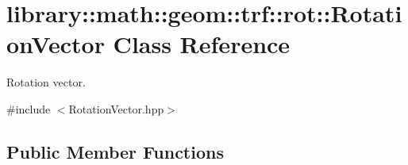 \hypertarget{classlibrary_1_1math_1_1geom_1_1trf_1_1rot_1_1_rotation_vector}{}\section{library\+:\+:math\+:\+:geom\+:\+:trf\+:\+:rot\+:\+:Rotation\+Vector Class Reference}
\label{classlibrary_1_1math_1_1geom_1_1trf_1_1rot_1_1_rotation_vector}


Rotation vector.  




{\ttfamily \#include $<$Rotation\+Vector.\+hpp$>$}

\subsection*{Public Member Functions}
